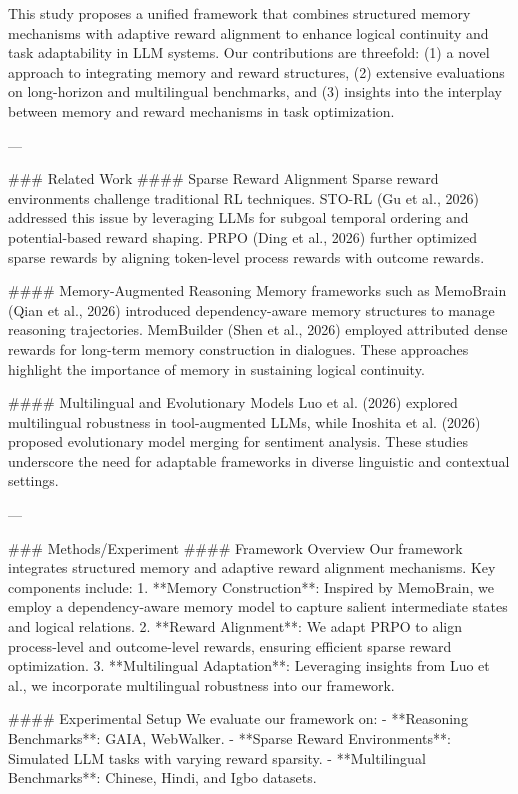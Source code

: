 This study proposes a unified framework that combines structured memory mechanisms with adaptive reward alignment to enhance logical continuity and task adaptability in LLM systems. Our contributions are threefold: (1) a novel approach to integrating memory and reward structures, (2) extensive evaluations on long-horizon and multilingual benchmarks, and (3) insights into the interplay between memory and reward mechanisms in task optimization.

---

### Related Work
#### Sparse Reward Alignment
Sparse reward environments challenge traditional RL techniques. STO-RL (Gu et al., 2026) addressed this issue by leveraging LLMs for subgoal temporal ordering and potential-based reward shaping. PRPO (Ding et al., 2026) further optimized sparse rewards by aligning token-level process rewards with outcome rewards.

#### Memory-Augmented Reasoning
Memory frameworks such as MemoBrain (Qian et al., 2026) introduced dependency-aware memory structures to manage reasoning trajectories. MemBuilder (Shen et al., 2026) employed attributed dense rewards for long-term memory construction in dialogues. These approaches highlight the importance of memory in sustaining logical continuity.

#### Multilingual and Evolutionary Models
Luo et al. (2026) explored multilingual robustness in tool-augmented LLMs, while Inoshita et al. (2026) proposed evolutionary model merging for sentiment analysis. These studies underscore the need for adaptable frameworks in diverse linguistic and contextual settings.

---

### Methods/Experiment
#### Framework Overview
Our framework integrates structured memory and adaptive reward alignment mechanisms. Key components include:
1. **Memory Construction**: Inspired by MemoBrain, we employ a dependency-aware memory model to capture salient intermediate states and logical relations.
2. **Reward Alignment**: We adapt PRPO to align process-level and outcome-level rewards, ensuring efficient sparse reward optimization.
3. **Multilingual Adaptation**: Leveraging insights from Luo et al., we incorporate multilingual robustness into our framework.

#### Experimental Setup
We evaluate our framework on:
- **Reasoning Benchmarks**: GAIA, WebWalker.
- **Sparse Reward Environments**: Simulated LLM tasks with varying reward sparsity.
- **Multilingual Benchmarks**: Chinese, Hindi, and Igbo datasets.

